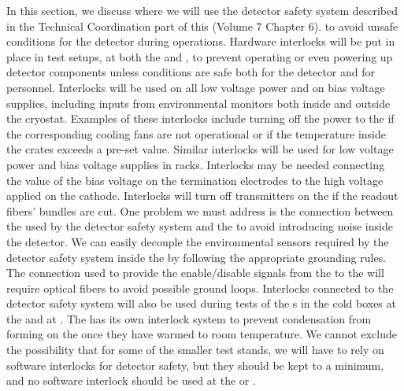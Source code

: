 In this section, we discuss where we will use
the detector safety system described in the Technical
Coordination part of this  (Volume 7 Chapter 6). %
to avoid unsafe conditions for the  detector 
during operations. Hardware interlocks will be put in place
in test setups, at both the  and , to prevent operating or even powering up
detector components 
unless conditions are safe
both for the detector and for personnel. Interlocks will be
used on all low voltage power and on bias voltage 
supplies, including inputs from environmental monitors both
inside and outside the cryostat. Examples of these interlocks include turning off the power to the 
if the corresponding cooling fans are not operational or
if the temperature inside the crates exceeds a pre-set value.
Similar interlocks will be used for low voltage power
and bias voltage supplies in  racks.
Interlocks may be needed connecting the value of the 
bias voltage on the  termination electrodes to the
high voltage applied on the  cathode. Interlocks will turn 
off transmitters on the  if the readout fibers'
bundles are cut. One problem we must address is 
the connection between the  used by the detector 
safety system and the  to avoid introducing noise 
inside the detector. We can easily decouple the environmental 
sensors required by the detector safety system inside the 
 by following the appropriate grounding rules. 
The connection used to provide the enable/disable signals 
from the  to the  will require optical 
fibers to avoid possible ground loops. Interlocks connected
to the detector safety system will also be used during tests 
of the s in the cold boxes at the  and 
at . The  has its own interlock system to
prevent condensation from forming on the  once
they have warmed to room temperature. We cannot exclude the possibility that for some of the smaller test stands, we will 
have to rely on software interlocks for detector safety,
but they should be kept to a minimum, and no software
interlock should be used at the  or .
